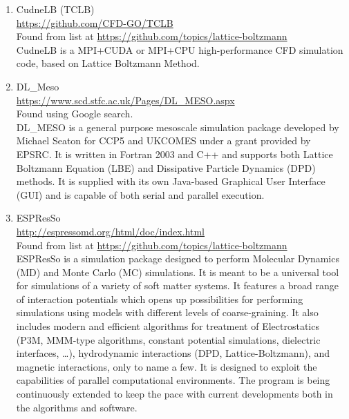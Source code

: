\documentclass{article}
\begin{document}
\begin{enumerate}
	\item CudneLB (TCLB)\\
	\href{https://github.com/CFD-GO/TCLB}{https://github.com/CFD-GO/TCLB}\\
		Found from list at \href{https://github.com/topics/lattice-boltzmann}{https://github.com/topics/lattice-boltzmann}\\
	CudneLB is a MPI+CUDA or MPI+CPU high-performance CFD simulation code, based on Lattice Boltzmann Method.
	
	\item DL\_Meso \\
	\href{https://www.scd.stfc.ac.uk/Pages/DL_MESO.aspx}{https://www.scd.stfc.ac.uk/Pages/DL\_MESO.aspx} \\
	Found using Google search.\\
	DL\_MESO is a general purpose mesoscale simulation package developed by Michael Seaton for CCP5 and UKCOMES​ under a grant provided by EPSRC. It is written in Fortran 2003 and C++ and supports both Lattice Boltzmann Equation (LBE) and Dissipative Particle Dynamics (DPD) methods. It is supplied with its own Java-based Graphical User Interface (GUI) and is capable of both serial and parallel execution.
	
	\item ESPResSo
\\
	\href{http://espressomd.org/html/doc/index.html}{http://espressomd.org/html/doc/index.html}
\\
		Found from list at \href{https://github.com/topics/lattice-boltzmann}{https://github.com/topics/lattice-boltzmann}\\
	ESPResSo is a simulation package designed to perform Molecular Dynamics (MD) and Monte Carlo (MC) simulations. It is meant to be a universal tool for simulations of a variety of soft matter systems. It features a broad range of interaction potentials which opens up possibilities for performing simulations using models with different levels of coarse-graining. It also includes modern and efficient algorithms for treatment of Electrostatics (P3M, MMM-type algorithms, constant potential simulations, dielectric interfaces, …), hydrodynamic interactions (DPD, Lattice-Boltzmann), and magnetic interactions, only to name a few. It is designed to exploit the capabilities of parallel computational environments. The program is being continuously extended to keep the pace with current developments both in the algorithms and software.
	

\end{enumerate}
\end{document}
